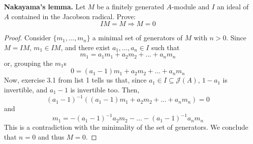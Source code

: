 \begin{problem} \label{itm:nakayamas_lemma}
    \textbf{Nakayama's lemma.} Let $M$ be a finitely generated $A$-module and $I$ an ideal of $A$ contained in the
    Jacobson radical.
    Prove:
    \[
        IM = M \Rightarrow M = 0
    \]
    \begin{sol}
        \begin{proof}
            Consider $\{m_1, \dots, m_n\}$ a minimal set of generators of $M$ with $n > 0$.
            Since $M = IM$, $m_1 \in IM$, and there exist $a_1, \dots, a_n \in I$ such that
            \[
                m_1 = a_1 m_1 + a_2 m_2 + \dots + a_n m_n
            \]
            or, grouping the $m_1$s
            \[
                0 = (a_1 - 1) m_1 + a_2 m_2 + \dots + a_n m_n
            \]
            Now, exercise 3.1 from list 1 tells us that, since $a_1 \in I \subseteq \mathcal{J}(A)$, $1 - a_1$ is
            invertible, and $a_1 - 1$ is invertible too.
            Then,
            \[
                (a_1 - 1)^{-1}((a_1 - 1) m_1 + a_2 m_2 + \dots + a_n m_n) = 0
            \]
            and
            \[
                m_1 = -(a_1 - 1)^{-1} a_2 m_2 - \dots - (a_1 - 1)^{-1} a_n m_n
            \]
            This is a contradiction with the minimality of the set of generators.
            We conclude that $n = 0$ and thus $M = 0$.
        \end{proof}
    \end{sol}
\end{problem}